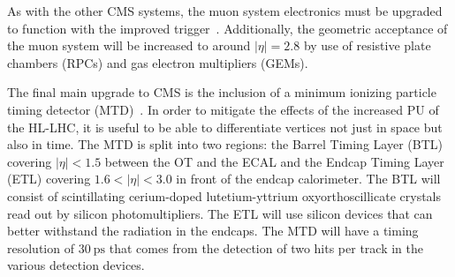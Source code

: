 As with the other CMS systems, the muon system electronics must be upgraded to function with the improved trigger~\cite{CERN-LHCC-2017-012}. Additionally, the geometric acceptance of the muon system will be increased to around $|\eta|=2.8$ by use of resistive plate chambers (RPCs) and gas electron multipliers (GEMs).

The final main upgrade to CMS is the inclusion of a minimum ionizing particle timing detector (MTD)~\cite{CMS:2667167}. In order to mitigate the effects of the increased PU of the HL-LHC, it is useful to be able to differentiate vertices not just in space but also in time. The MTD is split into two regions: the Barrel Timing Layer (BTL) covering $|\eta| < 1.5$ between the OT and the ECAL and the Endcap Timing Layer (ETL) covering $1.6 < |\eta| < 3.0$ in front of the endcap calorimeter. The BTL will consist of scintillating cerium-doped lutetium-yttrium oxyorthoscillicate crystals read out by silicon photomultipliers. The ETL will use silicon devices that can better withstand the radiation in the endcaps. The MTD will have a timing resolution of $\SI{30}{\ps}$ that comes from the detection of two hits per track in the various detection devices.
